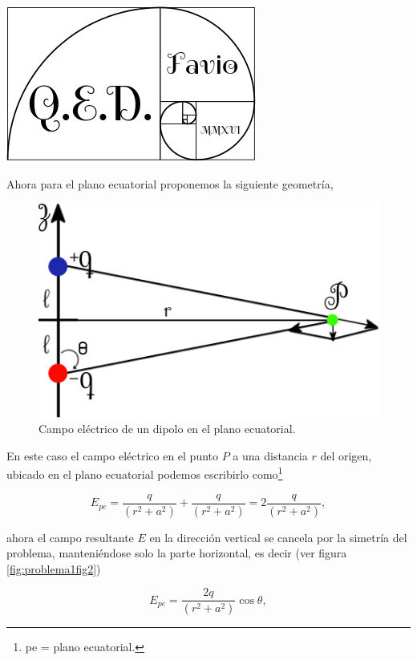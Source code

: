 \documentclass[a4paper,11pt]{article}
\numberwithin{equation}{section}
\begin{document}
\hspace{10cm}\includegraphics[scale=0.25]{logoQED}

\vspace{.2cm}

Ahora para el plano ecuatorial proponemos la siguiente geometría, 

\begin{figure}[H]
 \center 
 \includegraphics[scale=0.5]{problema1fig2}
 \caption{Campo eléctrico de un dipolo en el plano ecuatorial.}
 \label{fig:problema1fig2}
\end{figure}

En este caso el campo eléctrico en el punto $P$ a una distancia $r$ del origen, 
ubicado en el plano ecuatorial podemos escribirlo como\footnote{pe = plano ecuatorial.}

\begin{equation}
 E_{pe} = \frac{q}{(r^2+a^2)} + \frac{q}{(r^2+a^2)} = 2 \frac{q}{(r^2+a^2)},
\end{equation}

ahora el campo resultante $E$ en la dirección vertical se cancela por la simetría 
del problema, manteniéndose solo la parte horizontal, es decir (ver figura
\eqref{fig:problema1fig2})

\begin{equation}
 E_{pe} = \frac{2q}{(r^2+a^2)}\cos{\theta},
\end{equation}
\end{document}
